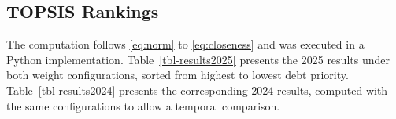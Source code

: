 \documentclass[
  journal,
]{IEEEtran}%
\begin{document}
\begin{table}

\caption{\label{tbl-raw-data}Indicator values per service, 2025}


\end{table}%

\subsection{TOPSIS Rankings}\label{topsis-rankings}

The computation follows \eqref{eq:norm} to \eqref{eq:closeness} and was
executed in a Python implementation. Table~\ref{tbl-results2025}
presents the 2025 results under both weight configurations, sorted from
highest to lowest debt priority. Table~\ref{tbl-results2024} presents
the corresponding 2024 results, computed with the same configurations to
allow a temporal comparison.

\begin{table}

\caption{\label{tbl-results2025}TOPSIS results, 2025 (higher \(C_i\),
lower debt priority)}


\end{table}%
\end{document}
